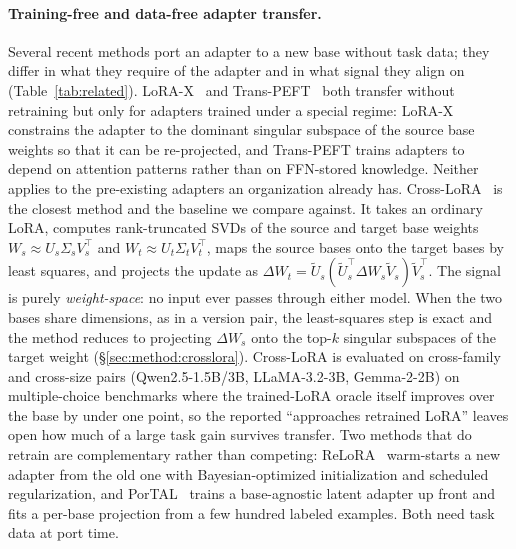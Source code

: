 \paragraph{Training-free and data-free adapter transfer.}
Several recent methods port an adapter to a new base without task data; they
differ in what they require of the adapter and in what signal they align on
(Table~\ref{tab:related}).
LoRA-X~\citep{farhadzadeh2025lorax} and Trans-PEFT~\citep{gu2025transpeft}
both transfer without retraining but only for adapters trained under a special
regime: LoRA-X constrains the adapter to the dominant singular subspace of the
source base weights so that it can be re-projected, and Trans-PEFT trains
adapters to depend on attention patterns rather than on FFN-stored knowledge.
Neither applies to the pre-existing adapters an organization already has.
Cross-LoRA~\citep{xia2025crosslora} is the closest method and the baseline we
compare against. It takes an ordinary LoRA, computes rank-truncated SVDs of the
source and target base weights $W_s\!\approx\!U_s\Sigma_sV_s^\top$ and
$W_t\!\approx\!U_t\Sigma_tV_t^\top$, maps the source bases onto the target
bases by least squares, and projects the update as
$\Delta W_t=\tilde U_s(\tilde U_s^\top\Delta W_s\tilde V_s)\tilde V_s^\top$.
The signal is purely \emph{weight-space}: no input ever passes through either
model. When the two bases share dimensions, as in a version pair, the
least-squares step is exact and the method reduces to projecting $\Delta W_s$
onto the top-$k$ singular subspaces of the target weight
(\S\ref{sec:method:crosslora}). Cross-LoRA is evaluated on cross-family and
cross-size pairs (Qwen2.5-1.5B/3B, LLaMA-3.2-3B, Gemma-2-2B) on multiple-choice
benchmarks where the trained-LoRA oracle itself improves over the base by under
one point, so the reported ``approaches retrained LoRA'' leaves open how much of
a large task gain survives transfer. Two methods that do retrain are
complementary rather than competing: ReLoRA~\citep{xu2026relora} warm-starts a
new adapter from the old one with Bayesian-optimized initialization and
scheduled regularization, and PorTAL~\citep{ramp2026portal} trains a
base-agnostic latent adapter up front and fits a per-base projection from a few
hundred labeled examples. Both need task data at port time.

